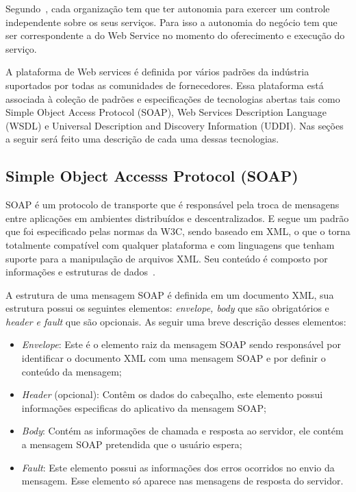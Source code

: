 Segundo~\cite{Bertino2010}, cada organização tem que ter autonomia para exercer um controle independente sobre os seus serviços. Para isso a autonomia do negócio tem que ser correspondente a do Web Service no momento do oferecimento e execução do serviço.

A plataforma de Web services é definida por vários padrões da indústria suportados por todas as comunidades de fornecedores. Essa plataforma está associada à coleção de padrões e especificações de tecnologias abertas tais como Simple Object Access Protocol (SOAP), Web Services Description Language (WSDL) e  Universal Description and Discovery Information (UDDI). Nas seções a seguir será feito uma descrição de cada uma dessas tecnologias.


\subsection{Simple Object Accesss Protocol (SOAP)}
SOAP é um protocolo de transporte que é responsável pela troca de mensagens entre aplicações em ambientes distribuídos e descentralizados. E segue um padrão que foi especificado pelas normas da W3C, sendo baseado em XML, o que o torna totalmente compatível com qualquer plataforma e com linguagens que tenham suporte para a manipulação de arquivos XML. Seu conteúdo é composto por informações e estruturas de dados~\cite{COYLE}.

A estrutura de uma mensagem SOAP é definida em um documento XML, sua estrutura possui os seguintes elementos:\emph{ envelope, body} que são obrigatórios e \emph{header e fault} que são opcionais. As seguir uma breve descrição desses elementos:

 \begin{itemize}
            \item \emph{Envelope}: Este é o elemento raiz da mensagem SOAP sendo responsável por identificar o documento XML com uma mensagem SOAP e por definir o conteúdo da mensagem;

            \item \emph{Header} (opcional): Contêm os dados do cabeçalho, este elemento possui informações especificas do aplicativo da mensagem SOAP;

            \item \emph{Body}: Contém as informações de chamada e resposta ao servidor, ele contém a mensagem SOAP pretendida que o usuário espera;

            \item \emph{Fault}: Este elemento possui as informações dos erros ocorridos no envio da mensagem. Esse elemento só aparece nas mensagens de resposta do servidor.

 \end{itemize}



